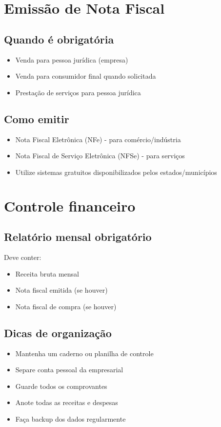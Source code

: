 \documentclass[12pt,a4paper]{article}
\begin{document}
\section{Emissão de Nota Fiscal}

\subsection{Quando é obrigatória}
\begin{itemize}
    \item Venda para pessoa jurídica (empresa)
    \item Venda para consumidor final quando solicitada
    \item Prestação de serviços para pessoa jurídica
\end{itemize}

\subsection{Como emitir}
\begin{itemize}
    \item Nota Fiscal Eletrônica (NFe) - para comércio/indústria
    \item Nota Fiscal de Serviço Eletrônica (NFSe) - para serviços
    \item Utilize sistemas gratuitos disponibilizados pelos estados/municípios
\end{itemize}

\section{Controle financeiro}

\subsection{Relatório mensal obrigatório}
Deve conter:
\begin{itemize}
    \item Receita bruta mensal
    \item Nota fiscal emitida (se houver)
    \item Nota fiscal de compra (se houver)
\end{itemize}

\subsection{Dicas de organização}
\begin{itemize}
    \item Mantenha um caderno ou planilha de controle
    \item Separe conta pessoal da empresarial
    \item Guarde todos os comprovantes
    \item Anote todas as receitas e despesas
    \item Faça backup dos dados regularmente
\end{itemize}
\end{document}
